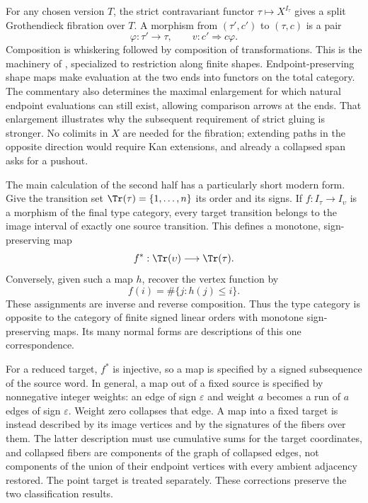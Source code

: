 For any chosen version $T$, the strict contravariant functor $\tau\mapsto X^{I_\tau}$ gives a split Grothendieck fibration over $T$. A morphism from $(\tau',c')$ to $(\tau,c)$ is a pair
\[
 \varphi:\tau'\to\tau,
 \qquad v:c'\Rightarrow c\varphi.
\]
Composition is whiskering followed by composition of transformations. This is the machinery of \citet[Expos\'e~VI, \S\S8--10]{GrothendieckSGA1}, specialized to restriction along finite shapes. Endpoint-preserving shape maps make evaluation at the two ends into functors on the total category. The commentary also determines the maximal enlargement for which natural endpoint evaluations can still exist, allowing comparison arrows at the ends. That enlargement illustrates why the subsequent requirement of strict gluing is stronger. No colimits in $X$ are needed for the fibration; extending paths in the opposite direction would require Kan extensions, and already a collapsed span asks for a pushout.

The main calculation of the second half has a particularly short modern form. Give the transition set $\Tr(\tau)=\{1,\ldots,n\}$ its order and its signs. If $f:I_\tau\to I_\upsilon$ is a morphism of the final type category, every target transition belongs to the image interval of exactly one source transition. This defines a monotone, sign-preserving map
\[
 f^*:\Tr(\upsilon)\longrightarrow\Tr(\tau).
\]
Conversely, given such a map $h$, recover the vertex function by
\[
 f(i)=\#\{j:h(j)\leq i\}.
\]
These assignments are inverse and reverse composition. Thus the type category is opposite to the category of finite signed linear orders with monotone sign-preserving maps. Its many normal forms are descriptions of this one correspondence.

For a reduced target, $f^*$ is injective, so a map is specified by a signed subsequence of the source word. In general, a map out of a fixed source is specified by nonnegative integer weights: an edge of sign $\varepsilon$ and weight $a$ becomes a run of $a$ edges of sign $\varepsilon$. Weight zero collapses that edge. A map into a fixed target is instead described by its image vertices and by the signatures of the fibers over them. The latter description must use cumulative sums for the target coordinates, and collapsed fibers are components of the graph of collapsed edges, not components of the union of their endpoint vertices with every ambient adjacency restored. The point target is treated separately. These corrections preserve the two classification results.

